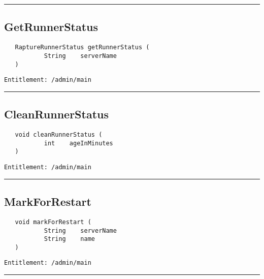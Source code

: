 \rule{12cm}{2pt}
\subsection{GetRunnerStatus}
\label{Api:GetRunnerStatus}
\begin{verbatim}
   RaptureRunnerStatus getRunnerStatus (
           String    serverName
   )
\end{verbatim}
\begin{Verbatim}[fontsize=\small, formatcom=\color{Maroon}]
  Entitlement: /admin/main
\end{Verbatim}



\rule{12cm}{2pt}
\subsection{CleanRunnerStatus}
\label{Api:CleanRunnerStatus}
\begin{verbatim}
   void cleanRunnerStatus (
           int    ageInMinutes
   )
\end{verbatim}
\begin{Verbatim}[fontsize=\small, formatcom=\color{Maroon}]
  Entitlement: /admin/main
\end{Verbatim}



\rule{12cm}{2pt}
\subsection{MarkForRestart}
\label{Api:MarkForRestart}
\begin{verbatim}
   void markForRestart (
           String    serverName
           String    name
   )
\end{verbatim}
\begin{Verbatim}[fontsize=\small, formatcom=\color{Maroon}]
  Entitlement: /admin/main
\end{Verbatim}



\rule{12cm}{2pt}
